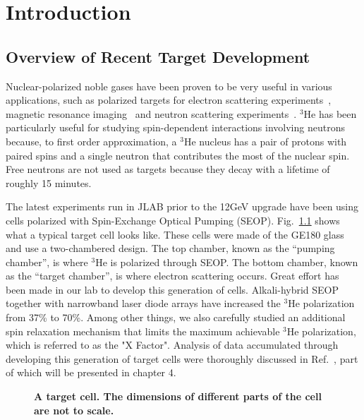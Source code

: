 \chapter{Introduction}
\label{chap:chap1}

\section{Overview of Recent Target Development}

Nuclear-polarized noble gases have been proven to be very useful in various applications, such as polarized targets for electron scattering experiments~\cite{PhysRevLett.71.959}, magnetic resonance imaging~\cite{MRI} and neutron scattering experiments~\cite{Neutron}. $^3$He has been particularly useful for studying spin-dependent interactions involving neutrons because, to first order approximation, a $^{3}$He nucleus has a pair of protons with paired spins and a single neutron that contributes the most of the nuclear spin. Free neutrons are not used as targets because they decay with a lifetime of roughly 15 minutes. 

The latest experiments run in JLAB prior to the 12GeV upgrade have been using cells polarized with Spin-Exchange Optical Pumping (SEOP). Fig.~\ref{TargetCell} shows what a typical target cell looks like. These cells were made of the GE180 glass and use a two-chambered design. The top chamber, known as the “pumping chamber”, is where $^{3}$He is polarized through SEOP. The bottom chamber, known as the “target chamber”, is where electron scattering occurs. Great effort has been made in our lab to develop this generation of cells. Alkali-hybrid SEOP together with narrowband laser diode arrays have increased the $^{3}$He polarization from 37\% to 70\%. Among other things, we also carefully studied an additional spin relaxation mechanism that limits the maximum achievable $^{3}$He polarization, which is referred to as the "X Factor". Analysis of data accumulated through developing this generation of target cells were thoroughly discussed in Ref.~\cite{PhysRevC.91.055205}, part of which will be presented in chapter 4. 

\begin{figure}[H]
	\centering
	\caption{{\bf A target cell. The dimensions of different parts of the cell are not to scale.}}
	\label{TargetCell}
\end{figure}

